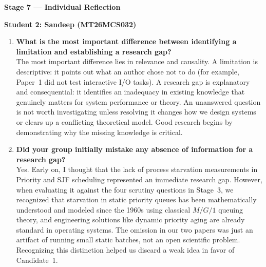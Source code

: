 \documentclass[11pt]{article}
\begin{document}
\newpage
{\centering\fontsize{16}{20}\selectfont\textbf{Stage 7 --- Individual Reflection}\par}
\vspace{1em}

{\centering\fontsize{14}{16.8}\selectfont \textbf{Student 2: Sandeep (MT26MCS032)}\par}
\vspace{1em}

\begin{enumerate}[leftmargin=1.5em, itemsep=1.0em]
    \item \textbf{What is the most important difference between identifying a limitation and establishing a research gap?} \\
    The most important difference lies in relevance and causality. A limitation is descriptive: it points out what an author chose not to do (for example, Paper~1 did not test interactive I/O tasks). A research gap is explanatory and consequential: it identifies an inadequacy in existing knowledge that genuinely matters for system performance or theory. An unanswered question is not worth investigating unless resolving it changes how we design systems or clears up a conflicting theoretical model. Good research begins by demonstrating why the missing knowledge is critical.

    \item \textbf{Did your group initially mistake any absence of information for a research gap?} \\
    Yes. Early on, I thought that the lack of process starvation measurements in Priority and SJF scheduling represented an immediate research gap. However, when evaluating it against the four scrutiny questions in Stage~3, we recognized that starvation in static priority queues has been mathematically understood and modeled since the 1960s using classical $M/G/1$ queuing theory, and engineering solutions like dynamic priority aging are already standard in operating systems. The omission in our two papers was just an artifact of running small static batches, not an open scientific problem. Recognizing this distinction helped us discard a weak idea in favor of Candidate~1.


\end{enumerate}
\end{document}
